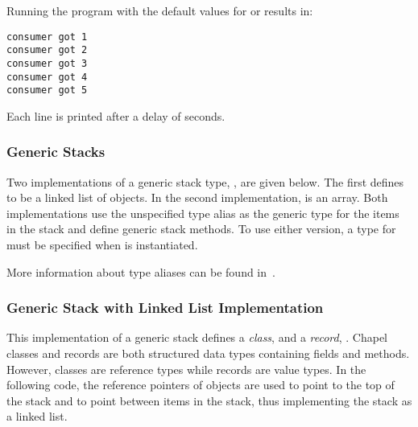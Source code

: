 Running the program with the default 
values for  or  results in: 
\small{
\begin{verbatim}
consumer got 1
consumer got 2
consumer got 3
consumer got 4
consumer got 5
\end{verbatim}}
Each line is printed after a delay of  seconds.


\subsubsection{Generic Stacks}
Two implementations of a generic stack type, , are given below.  The first
defines  to be a linked list of  objects.  In
the second implementation,  is an array.  Both implementations
use the unspecified type alias  as the generic type for the items
in the stack and define generic stack methods.  To use either version,
a type for  must be specified when  is instantiated.

More information about type aliases can be found 
in~.

\subsubsection{Generic Stack with Linked List Implementation}
This implementation of a generic stack defines a {\em class},
 and a {\em record}, .  Chapel classes and records
are both structured data types containing fields and methods.  However,
classes are reference types while records are value types.  In the following
code, the reference pointers of  objects are used to point to
the top of the stack and to point between items in the stack,
thus implementing the stack as a linked list.

